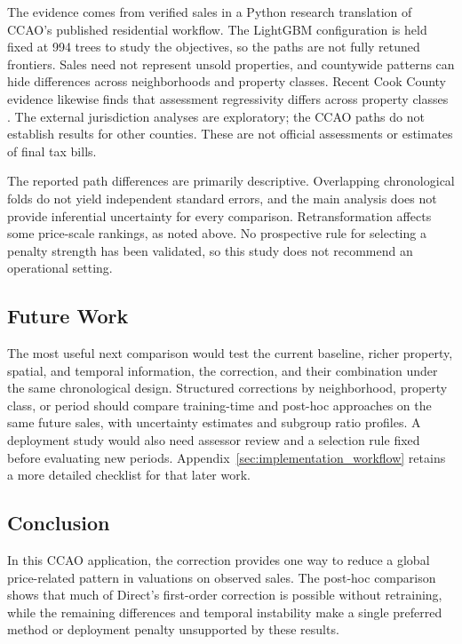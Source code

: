 \documentclass[10pt]{article}
\theoremstyle{definition}
\newcommand{\1}{\mathbf{1}}
\begin{document}
The evidence comes from verified sales in a Python research translation of
CCAO's published residential workflow. The LightGBM configuration is held
fixed at 994 trees to study the objectives, so the paths are not fully retuned
frontiers. Sales need not represent unsold properties, and countywide patterns
can hide differences across neighborhoods and property classes. Recent Cook
County evidence likewise finds that assessment regressivity differs across
property classes \cite{CaiWiley2026}. The external
jurisdiction analyses are exploratory; the CCAO paths do not establish results
for other counties. These are not official assessments or estimates of final
tax bills.

The reported path differences are primarily descriptive. Overlapping
chronological folds do not yield independent standard errors, and the main
analysis does not provide inferential uncertainty for every comparison.
Retransformation affects some price-scale rankings, as noted above. No
prospective rule for selecting a penalty strength has been validated, so this
study does not recommend an operational setting.

\subsection{Future Work}

The most useful next comparison would test the current baseline, richer
property, spatial, and temporal information, the correction, and their
combination under the same chronological design. Structured corrections by
neighborhood, property class, or period
should compare training-time and post-hoc approaches on the same future sales,
with uncertainty estimates and subgroup ratio profiles. A deployment study
would also need assessor review and a selection rule fixed before evaluating
new periods. Appendix~\ref{sec:implementation_workflow} retains a more detailed
checklist for that later work.

\subsection{Conclusion}

In this CCAO application, the correction provides one way to reduce a global
price-related pattern in valuations on observed sales. The post-hoc comparison
shows that much of Direct's first-order correction is possible without
retraining, while the remaining differences and temporal instability make a
single preferred method or deployment penalty unsupported by these results.
\end{document}

